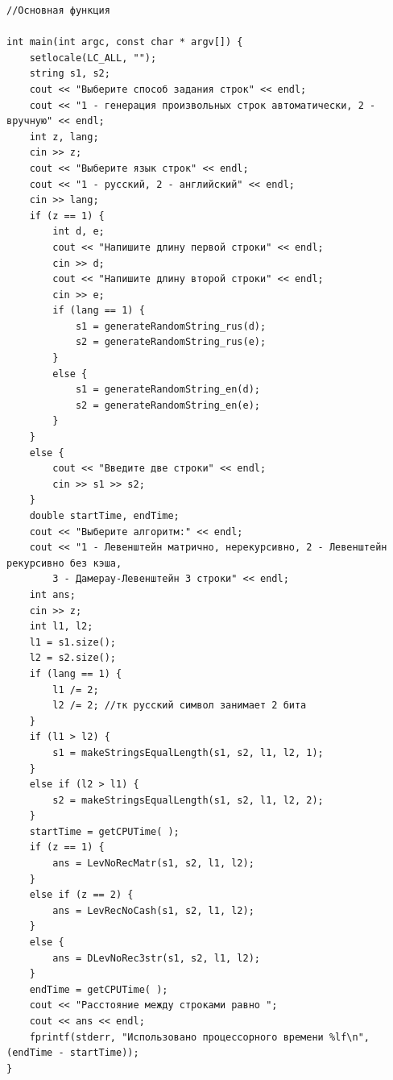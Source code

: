\documentclass[12pt, a4paper]{article}
\begin{document}
\begin{lstlisting}
//Основная функция

int main(int argc, const char * argv[]) {
    setlocale(LC_ALL, "");
    string s1, s2;
    cout << "Выберите способ задания строк" << endl;
    cout << "1 - генерация произвольных строк автоматически, 2 - вручную" << endl;
    int z, lang;
    cin >> z;
    cout << "Выберите язык строк" << endl;
    cout << "1 - русский, 2 - английский" << endl;
    cin >> lang;
    if (z == 1) {
        int d, e;
        cout << "Напишите длину первой строки" << endl;
        cin >> d;
        cout << "Напишите длину второй строки" << endl;
        cin >> e;
        if (lang == 1) {
            s1 = generateRandomString_rus(d);
            s2 = generateRandomString_rus(e);
        }
        else {
            s1 = generateRandomString_en(d);
            s2 = generateRandomString_en(e);
        }
    }
    else {
        cout << "Введите две строки" << endl;
        cin >> s1 >> s2;
    }
    double startTime, endTime;
    cout << "Выберите алгоритм:" << endl;
    cout << "1 - Левенштейн матрично, нерекурсивно, 2 - Левенштейн рекурсивно без кэша, 
    	3 - Дамерау-Левенштейн 3 строки" << endl;
    int ans;
    cin >> z;
    int l1, l2;
    l1 = s1.size();
    l2 = s2.size();
    if (lang == 1) {
        l1 /= 2;
        l2 /= 2; //тк русский символ занимает 2 бита
    }
    if (l1 > l2) {
        s1 = makeStringsEqualLength(s1, s2, l1, l2, 1);
    }
    else if (l2 > l1) {
        s2 = makeStringsEqualLength(s1, s2, l1, l2, 2);
    }
    startTime = getCPUTime( );
    if (z == 1) {
        ans = LevNoRecMatr(s1, s2, l1, l2);
    }
    else if (z == 2) {
        ans = LevRecNoCash(s1, s2, l1, l2);
    }
    else {
        ans = DLevNoRec3str(s1, s2, l1, l2);
    }
    endTime = getCPUTime( );
    cout << "Расстояние между строками равно ";
    cout << ans << endl;
    fprintf(stderr, "Использовано процессорного времени %lf\n", (endTime - startTime));
}
\end{lstlisting}
\newpage
\end{document}
